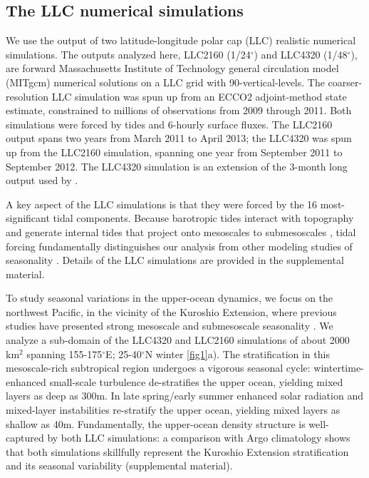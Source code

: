 \documentclass[grl]{agutex2015}
\begin{document}
\begin{article}
\section{The LLC numerical simulations}
We use the output of two latitude-longitude polar cap (LLC)
realistic numerical simulations. The outputs
analyzed here, LLC2160 (1/24$^\circ$) and LLC4320 (1/48$^\circ$),   are
forward Massachusetts Institute of Technology general circulation model (MITgcm)
numerical solutions on a LLC grid  \citep{forget_etal2015} with
90-vertical-levels. The coarser-resolution LLC simulation was
spun up from an ECCO2 adjoint-method state estimate, constrained to millions
of observations from 2009 through 2011. Both simulations were forced by
tides and 6-hourly surface fluxes. The LLC2160
output spans two years from March 2011 to April 2013; the LLC4320 was spun up from
the LLC2160 simulation, spanning one year from September 2011 to September 2012.
The LLC4320 simulation is an extension of the 3-month long output used by
\citet{rocha_etal2016}.

A key aspect of the LLC simulations is that they were forced by
the 16 most-significant tidal components.
Because barotropic tides interact with topography and generate internal
tides that project onto mesoscales to submesoscales
\citep[e.g., ][]{rocha_etal2016}, tidal forcing fundamentally distinguishes our analysis
from other modeling studies of seasonality \citep{sasaki_etal2014,qiu_etal2014}. Details of the LLC simulations
are provided in the supplemental material.

To study seasonal variations in the upper-ocean dynamics, we focus on the northwest
Pacific, in the vicinity of the Kuroshio
Extension, where previous studies have presented strong mesoscale and submesoscale seasonality
\citep{sasaki_etal2014,qiu_etal2014}.
We analyze a sub-domain of the LLC4320 and LLC2160 simulations of about 2000 km$^2$
spanning 155-175$^\circ$E; 25-40$^\circ$N winter \ref{fig1}a). The stratification
in this mesoscale-rich subtropical region undergoes a vigorous seasonal cycle: wintertime-enhanced
small-scale turbulence de-stratifies the upper ocean, yielding mixed layers
as deep as 300m. In late spring/early summer enhanced solar radiation and mixed-layer
instabilities re-stratify the upper ocean, yielding mixed layers as shallow as 40m.
Fundamentally, the upper-ocean density structure is well-captured by both LLC simulations:
a comparison with Argo climatology shows that both simulations skillfully represent the Kuroshio
Extension stratification and its seasonal variability  (supplemental material).


\end{article}
\end{document}
